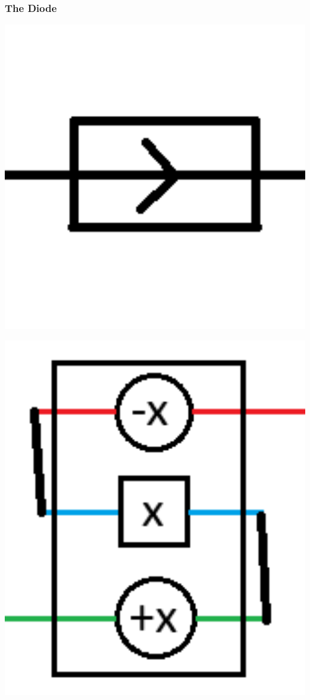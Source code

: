 \documentclass{beamer}
\begin{document}
\begin{frame}
  \frametitle{The Diode}
  \begin{minipage}[t]{0.49\textwidth}
    \includegraphics[width=1\textwidth]{res/Diode.png}
  \end{minipage}
  \begin{minipage}[t]{0.49\textwidth}
    \includegraphics[width=1\textwidth]{res/DiodSim.png}
  \end{minipage}
\end{frame}
\end{document}
